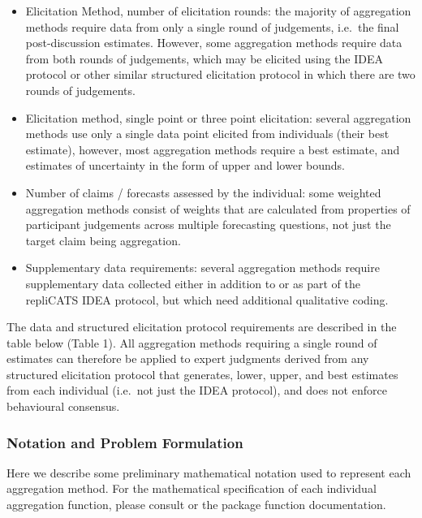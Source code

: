 \documentclass[article]{jss}
\providecommand{\tightlist}{%
  \setlength{\itemsep}{0pt}\setlength{\parskip}{0pt}}\usepackage{longtable,booktabs,array}
\begin{document}
\begin{itemize}
\tightlist
\item
  Elicitation Method, number of elicitation rounds: the majority of
  aggregation methods require data from only a single round of
  judgements, i.e.~the final post-discussion estimates. However, some
  aggregation methods require data from both rounds of judgements, which
  may be elicited using the IDEA protocol or other similar structured
  elicitation protocol in which there are two rounds of judgements.
\item
  Elicitation method, single point or three point elicitation: several
  aggregation methods use only a single data point elicited from
  individuals (their best estimate), however, most aggregation methods
  require a best estimate, and estimates of uncertainty in the form of
  upper and lower bounds.
\item
  Number of claims / forecasts assessed by the individual: some weighted
  aggregation methods consist of weights that are calculated from
  properties of participant judgements across multiple forecasting
  questions, not just the target claim being aggregation.
\item
  Supplementary data requirements: several aggregation methods require
  supplementary data collected either in addition to or as part of the
  repliCATS IDEA protocol, but which need additional qualitative coding.
\end{itemize}

The data and structured elicitation protocol requirements are described
in the table below (Table 1). All aggregation methods requiring a single
round of estimates can therefore be applied to expert judgments derived
from any structured elicitation protocol that generates, lower, upper,
and best estimates from each individual (i.e.~not just the IDEA
protocol), and does not enforce behavioural consensus.

\hypertarget{notation-and-problem-formulation}{%
\subsubsection{Notation and Problem
Formulation}\label{notation-and-problem-formulation}}

Here we describe some preliminary mathematical notation used to
represent each aggregation method. For the mathematical specification of
each individual aggregation function, please consult \citep{Hanea2021}
or the  package function documentation.
\end{document}
